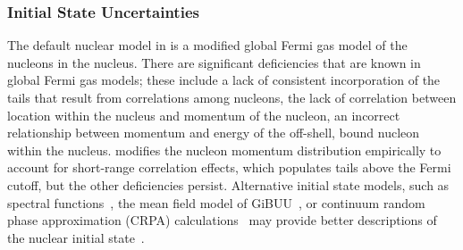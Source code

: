 \subsubsection{Initial State Uncertainties}
The default nuclear model in  is a modified global Fermi gas model of the nucleons in the nucleus.  There are significant deficiencies that are known in global Fermi gas models; these include a lack of consistent incorporation of the tails that result from correlations among nucleons, the lack of correlation between location within the nucleus and momentum of the nucleon, an incorrect relationship between momentum and energy of the off-shell, bound nucleon within the nucleus.  modifies the nucleon momentum distribution empirically to account for short-range correlation effects, which populates tails above the Fermi cutoff, but the other deficiencies persist. Alternative initial state models, such as spectral functions~\cite{Benhar:1994hw,Nieves:2004wx}, the mean field model of GiBUU~\cite{Gallmeister:2016dnq}, or continuum random phase approximation (CRPA) calculations~\cite{Pandey:2014tza} may provide better descriptions of the nuclear initial state~\cite{Sobczyk:2017mts}. %





